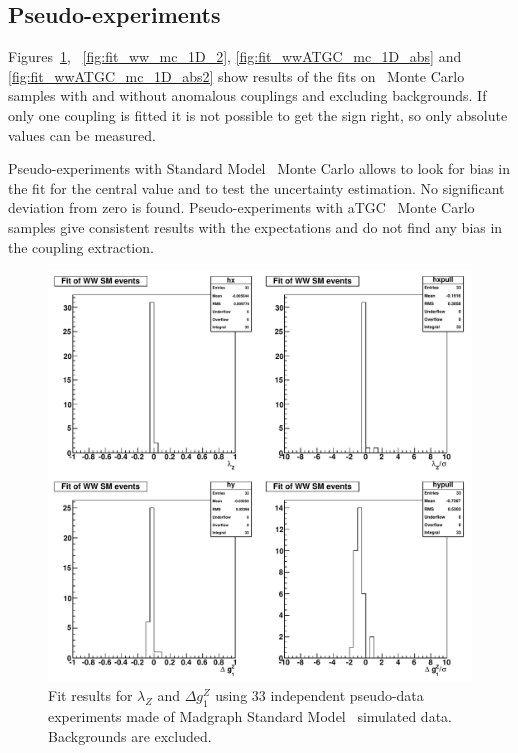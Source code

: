 \subsection{Pseudo-experiments}
Figures~\ref{fig:fit_ww_mc_1D},
~\ref{fig:fit_ww_mc_1D_2}, \ref{fig:fit_wwATGC_mc_1D_abs} and
\ref{fig:fit_wwATGC_mc_1D_abs2} show results of the fits on \ww\ Monte
Carlo samples with and without anomalous couplings and excluding
backgrounds. If only one coupling is fitted
it is not possible to get the sign right, so only absolute
values can be measured.

Pseudo-experiments with Standard Model \ww\ Monte Carlo allows to look
for bias in the fit for the central value and to test the uncertainty
estimation. No significant deviation from zero is
found. Pseudo-experiments with aTGC \ww\ Monte Carlo samples give
consistent results with the expectations and do not find any bias in
the coupling extraction.

\begin{figure}[tp]
  \centerline{
    \includegraphics[width=1.0\textwidth]{figures/fit_ww_mc_1D}
  }

  \caption[1D fits to WW SM Monte Carlo] {Fit results for
  $\lambda_{Z}$ and $\Delta g^Z_1$ using 33 independent pseudo-data
  experiments made of Madgraph Standard Model \ww\ simulated
  data. Backgrounds are excluded.}

\label{fig:fit_ww_mc_1D}
\end{figure}

